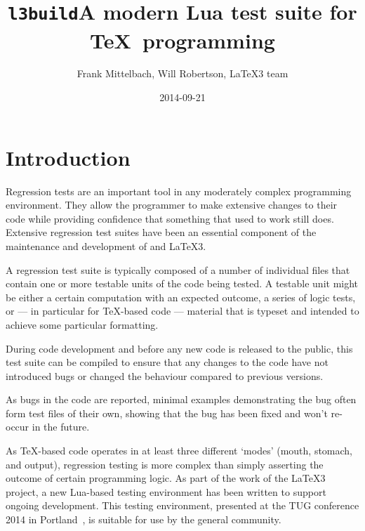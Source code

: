 \documentclass[a4paper]{ltugboat}
\begin{document}
\title{\texttt{l3build}\dash A modern Lua test suite for \TeX\ programming}
\author{Frank Mittelbach, Will Robertson, \LaTeX3 team}
\address{%
  Mainz,  Germany\\
  School of Mechanical Engineering, The University of Adelaide, Australia}
\date{2014-09-21}



\newcommand\drivername{build.lua}
\newcommand\makename{l3build.lua}
\newcommand\execname{texlua \drivername}

\setcounter{page}{777}

\newcommand\pdfTeX{pdf\TeX}
\newcommand\luaTeX{Lua\TeX}

\maketitle

\tableofcontents

\section{Introduction}

Regression tests are an important tool in any moderately complex
programming environment.  They allow the programmer to make extensive
changes to their code while providing confidence that something that
used to work still does.  Extensive regression test suites have been
an essential component of the maintenance and development of \LaTeXe{}
and \LaTeX3.

A regression test suite is typically composed of a number of
individual files that contain one or more testable units of the code
being tested. A testable unit might be either a certain computation
with an expected outcome, a series of logic tests, or --- in
particular for \TeX{}-based code --- material that is typeset and
intended to achieve some particular formatting.

During code development and before any new code is released to the
public, this test suite can be compiled to ensure that any changes to
the code have not introduced bugs or changed the behaviour compared to
previous versions.

As bugs in the code are reported, minimal examples demonstrating the
bug often form test files of their own, showing that the bug has been
fixed and won't re-occur in the future.

As \TeX{}-based code operates in at least three different `modes'
(mouth, stomach, and output), regression testing is more complex than
simply asserting the outcome of certain programming logic.  As part of
the work of the \LaTeX3 project, a new Lua-based testing environment
has been written to support ongoing development.  This testing
environment, presented at the TUG conference 2014 in
Portland~\cite{Mittelbach:l3buildtalk}, is suitable for use by the
general community.
\end{document}
